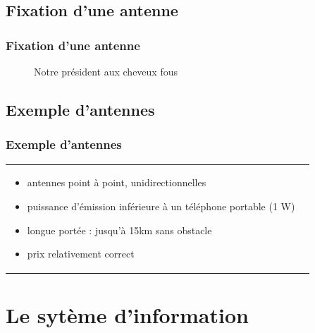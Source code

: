 \documentclass[handout]{beamer}
\begin{document}
	\subsection{Fixation d'une antenne}
		\begin{frame}
		\frametitle{Fixation d'une antenne}
		\vspace{-5px}
		\begin{center}
			\begin{figure}[h]
				\caption{Notre président aux cheveux fous}
			\end{figure}
		\end{center}
		
		\end{frame}

	\subsection{Exemple d'antennes}
		\begin{frame}
		\frametitle{Exemple d'antennes}
		\begin{tabular}{l l}
			\begin{minipage}{0.4\textwidth}
				\begin{center}
				\end{center}
			\end{minipage}

			\begin{minipage}{0.6\textwidth}
				\begin{itemize}
					\item antennes point à point, unidirectionnelles
					\item puissance d'émission inférieure à un téléphone portable (1 W)
					\item longue portée : jusqu'à 15km sans obstacle
					\item prix relativement correct
				\end{itemize}
			\end{minipage}
			
		\end{tabular}
		\end{frame}

	\section{Le sytème d'information}
\end{document}

